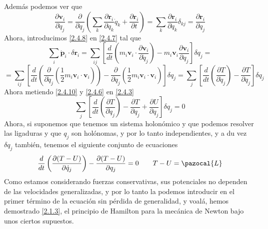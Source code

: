 Además podemos ver que
\begin{equation} \label{2.4.9}
    \frac{\partial \mathbf{v}_i}{\partial \dot{q}_j} = \frac{\partial}{\partial \dot{q}_j}\left( \sum_k \frac{\partial \mathbf{r}_i}{ \partial q_k}\dot{q}_k + \frac{\partial\mathbf{r}_i}{\partial t} \right) = \sum_k \frac{\partial \mathbf{r}_i}{ \partial q_k} \delta_{kj} =  \frac{\partial \mathbf{r}_i}{ \partial q_j}
\end{equation} 
Ahora, introducimos \eqref{2.4.8} en \eqref{2.4.7} tal que
\[\sum_i \dot{\mathbf{p}}_i \cdot \delta \mathbf{r}_i = \sum_{ij} \left[ \frac{d}{dt}\left(m_i \mathbf{v}_i \cdot \frac{\partial \mathbf{v}_i}{\partial \dot{q}_j}\right)- m_i \mathbf{v}_i\frac{\partial \mathbf{v}_i}{\partial q_j}\right] \delta q_j = \]
\begin{equation} \label{2.4.10}
     = \sum_{ij} \left[ \frac{d}{dt}\left(\frac{\partial}{\partial \dot{q}_j} \left(\frac{1}{2}m_i \mathbf{v}_i \cdot \mathbf{v}_i\right)\right)- \frac{\partial}{\partial q_j} \left(\frac{1}{2}m_i \mathbf{v}_i \cdot \mathbf{v}_i\right)\right] \delta q_j = \sum_{j} \left[ \frac{d}{dt}\left(\frac{\partial T}{\partial \dot{q}_j}\right)- \frac{\partial T}{\partial q_j}\right] \delta q_j
\end{equation} 
Ahora metiendo \eqref{2.4.10} y \eqref{2.4.6} en \eqref{2.4.3}
\begin{equation} \label{2.4.11}
    \sum_{j} \left[ \frac{d}{dt}\left(\frac{\partial T}{\partial \dot{q}_j}\right)- \frac{\partial T}{\partial q_j} +\frac{\partial U}{\partial q_j}\right] \delta q_j = 0
\end{equation} 
Ahora, si suponemos que tenemos un sistema holonómico y que podemos resolver las ligaduras y que $q_j$ son holónomas, y por lo tanto independientes, y a du vez $\delta q_j$ también, tenemos el siguiente conjunto de ecuaciones
\begin{equation} \label{2.4.12}
    \frac{d}{dt}\left(\frac{\partial (T-U)}{\partial \dot{q}_j}\right)-\frac{\partial (T-U)}{\partial q_j} = 0 \ \ \ \ \ \ T-U= \pazocal{L}
\end{equation} 
Como estamos considerando fuerzas conservativas, sus potenciales no dependen de las velocidades generalizadas, y por lo tanto la podemos introducir en el primer término de la ecuación sin pérdida de generalidad, y voalá, hemos demostrado \eqref{2.1.3}, el principio de Hamilton para la mecánica de Newton bajo unos ciertos supuestos.


